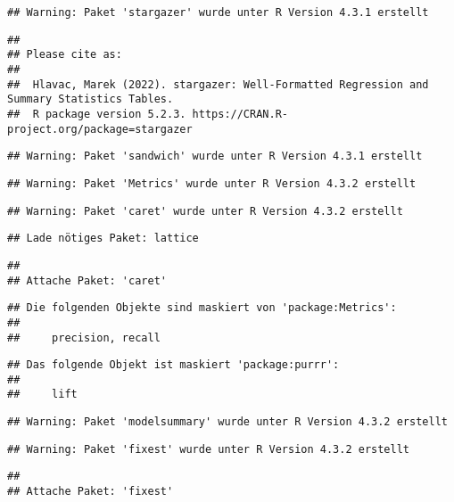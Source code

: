 \documentclass[
]{article}
\begin{document}
\begin{verbatim}
## Warning: Paket 'stargazer' wurde unter R Version 4.3.1 erstellt
\end{verbatim}

\begin{verbatim}
## 
## Please cite as: 
## 
##  Hlavac, Marek (2022). stargazer: Well-Formatted Regression and Summary Statistics Tables.
##  R package version 5.2.3. https://CRAN.R-project.org/package=stargazer
\end{verbatim}

\begin{verbatim}
## Warning: Paket 'sandwich' wurde unter R Version 4.3.1 erstellt
\end{verbatim}

\begin{verbatim}
## Warning: Paket 'Metrics' wurde unter R Version 4.3.2 erstellt
\end{verbatim}

\begin{verbatim}
## Warning: Paket 'caret' wurde unter R Version 4.3.2 erstellt
\end{verbatim}

\begin{verbatim}
## Lade nötiges Paket: lattice
\end{verbatim}

\begin{verbatim}
## 
## Attache Paket: 'caret'
\end{verbatim}

\begin{verbatim}
## Die folgenden Objekte sind maskiert von 'package:Metrics':
## 
##     precision, recall
\end{verbatim}

\begin{verbatim}
## Das folgende Objekt ist maskiert 'package:purrr':
## 
##     lift
\end{verbatim}

\begin{verbatim}
## Warning: Paket 'modelsummary' wurde unter R Version 4.3.2 erstellt
\end{verbatim}

\begin{verbatim}
## Warning: Paket 'fixest' wurde unter R Version 4.3.2 erstellt
\end{verbatim}

\begin{verbatim}
## 
## Attache Paket: 'fixest'
\end{verbatim}
\end{document}
